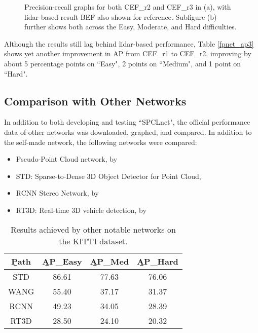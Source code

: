 \begin{figure}[H]
	\centering
	\caption{Precision-recall graphs for both CEF\_r2 and CEF\_r3 in (a), with lidar-based result BEF also shown for reference. Subfigure (b) further shows both across the Easy, Moderate, and Hard difficulties.}
	\label{fpnet_pr3}
\end{figure}

Although the results still lag behind lidar-based performance, Table \ref{fpnet_ap3} shows yet another improvement in AP from CEF\_r1 to CEF\_r2, improving by about 5 percentage points on ``Easy", 2 points on ``Medium", and 1 point on ``Hard".


\subsection{Comparison with Other Networks} 
In addition to both developing and testing ``SPCLnet", the official performance data of other networks was downloaded, graphed, and compared. In addition to the self-made network, the following networks were compared: 
\begin{itemize}
	\item Pseudo-Point Cloud network, by \cite{wang_pseudo-lidar_2019}
	\item STD: Sparse-to-Dense 3D Object Detector for Point Cloud, \cite{yang2019std}
	\item RCNN Stereo Network, by \cite{li_stereo_2019}
	\item RT3D: Real-time 3D vehicle detection, by \cite{zeng2018rt3d}
\end{itemize}

\begin{table}[ht]
	\centering
	\caption{Results achieved by other notable networks on the KITTI dataset.}
	\begin{tabular}{|c|c|c|c|}
		\hline
		\b{Path} & \b{AP\_Easy} & \b{AP\_Med} & \b{AP\_Hard} \\ \hline
		  STD    &    86.61     &    77.63    &    76.06     \\ \hline
		  WANG   &    55.40     &    37.17    &    31.37     \\ \hline
		  RCNN   &    49.23     &    34.05    &    28.39     \\ \hline
		  RT3D   &    28.50     &    24.10    &    20.32     \\ \hline
	\end{tabular}
	\label{fpnet_ap4}
\end{table}

